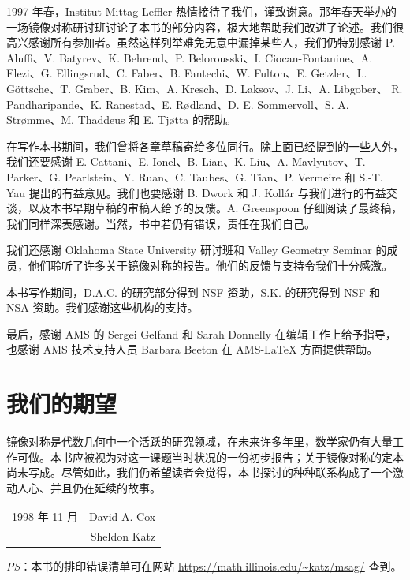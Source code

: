  1997 年春，Institut Mittag-Leffler 热情接待了我们，谨致谢意。那年春天举办的一场镜像对称研讨班讨论了本书的部分内容，极大地帮助我们改进了论述。我们很高兴感谢所有参加者。虽然这样列举难免无意中漏掉某些人，我们仍特别感谢 P. Aluffi、V. Batyrev、K. Behrend、P. Belorousski、I. Ciocan-Fontanine、A. Elezi、G. Ellingsrud、C. Faber、B. Fantechi、W. Fulton、E. Getzler、L. Göttsche、T. Graber、B. Kim、A. Kresch、D. Laksov、J. Li、A. Libgober、
R. Pandharipande、K. Ranestad、E. Rødland、D. E. Sommervoll、S. A. Strømme、M. Thaddeus 和 E. Tjøtta 的帮助。

 在写作本书期间，我们曾将各章草稿寄给多位同行。除上面已经提到的一些人外，我们还要感谢 E. Cattani、E. Ionel、B. Lian、K. Liu、A. Mavlyutov、T. Parker、G. Pearlstein、Y. Ruan、C. Taubes、G. Tian、P. Vermeire 和 S.-T. Yau 提出的有益意见。我们也要感谢 B. Dwork 和 J. Kollár 与我们进行的有益交谈，以及本书早期草稿的审稿人给予的反馈。A. Greenspoon 仔细阅读了最终稿，我们同样深表感谢。当然，书中若仍有错误，责任在我们自己。

我们还感谢 Oklahoma State University 研讨班和 Valley Geometry Seminar 的成员，他们聆听了许多关于镜像对称的报告。他们的反馈与支持令我们十分感激。

本书写作期间，D.A.C. 的研究部分得到 NSF 资助，S.K. 的研究得到 NSF 和 NSA 资助。我们感谢这些机构的支持。

最后，感谢 AMS 的 Sergei Gelfand 和 Sarah Donnelly 在编辑工作上给予指导，也感谢 AMS 技术支持人员 Barbara Beeton 在 AMS-\LaTeX{} 方面提供帮助。

\section*{我们的期望}
镜像对称是代数几何中一个活跃的研究领域，在未来许多年里，数学家仍有大量工作可做。本书应被视为对这一课题当时状况的一份初步报告；关于镜像对称的定本尚未写成。尽管如此，我们仍希望读者会觉得，本书探讨的种种联系构成了一个激动人心、并且仍在延续的故事。

\noindent\begin{tabular*}{\textwidth}{@{}l@{\extracolsep{\fill}}r@{}}1998 年 11 月 & David A. Cox\\ & Sheldon Katz\end{tabular*}

\noindent\emph{PS}：本书的排印错误清单可在网站 \url{https://math.illinois.edu/~katz/msag/} 查到。
\par\endgroup
